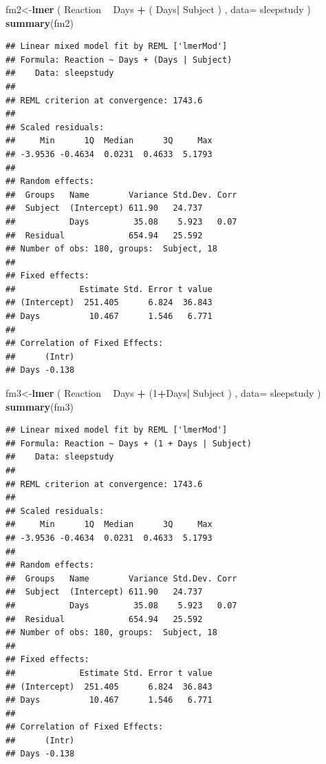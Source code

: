 \documentclass[]{book}
\newenvironment{Shaded}{\begin{snugshade}}{\end{snugshade}}
\newcommand{\KeywordTok}[1]{\textcolor[rgb]{0.13,0.29,0.53}{\textbf{#1}}}
\newcommand{\DataTypeTok}[1]{\textcolor[rgb]{0.13,0.29,0.53}{#1}}
\newcommand{\DecValTok}[1]{\textcolor[rgb]{0.00,0.00,0.81}{#1}}
\newcommand{\StringTok}[1]{\textcolor[rgb]{0.31,0.60,0.02}{#1}}
\newcommand{\OperatorTok}[1]{\textcolor[rgb]{0.81,0.36,0.00}{\textbf{#1}}}
\newcommand{\NormalTok}[1]{#1}
\begin{document}
\begin{Shaded}
\begin{Highlighting}[]
\NormalTok{fm2<-}\KeywordTok{lmer}\NormalTok{ ( Reaction }\OperatorTok{~}\StringTok{ }\NormalTok{Days }\OperatorTok{+}\StringTok{ }\NormalTok{( Days}\OperatorTok{|}\StringTok{ }\NormalTok{Subject ) , }\DataTypeTok{data=}\NormalTok{ sleepstudy )}
\KeywordTok{summary}\NormalTok{(fm2)}
\end{Highlighting}
\end{Shaded}

\begin{verbatim}
## Linear mixed model fit by REML ['lmerMod']
## Formula: Reaction ~ Days + (Days | Subject)
##    Data: sleepstudy
## 
## REML criterion at convergence: 1743.6
## 
## Scaled residuals: 
##     Min      1Q  Median      3Q     Max 
## -3.9536 -0.4634  0.0231  0.4633  5.1793 
## 
## Random effects:
##  Groups   Name        Variance Std.Dev. Corr
##  Subject  (Intercept) 611.90   24.737       
##           Days         35.08    5.923   0.07
##  Residual             654.94   25.592       
## Number of obs: 180, groups:  Subject, 18
## 
## Fixed effects:
##             Estimate Std. Error t value
## (Intercept)  251.405      6.824  36.843
## Days          10.467      1.546   6.771
## 
## Correlation of Fixed Effects:
##      (Intr)
## Days -0.138
\end{verbatim}

\begin{Shaded}
\begin{Highlighting}[]
\NormalTok{fm3<-}\KeywordTok{lmer}\NormalTok{ ( Reaction }\OperatorTok{~}\StringTok{ }\NormalTok{Days }\OperatorTok{+}\StringTok{ }\NormalTok{(}\DecValTok{1}\OperatorTok{+}\NormalTok{Days}\OperatorTok{|}\StringTok{ }\NormalTok{Subject ) , }\DataTypeTok{data=}\NormalTok{ sleepstudy )}
\KeywordTok{summary}\NormalTok{(fm3)}
\end{Highlighting}
\end{Shaded}

\begin{verbatim}
## Linear mixed model fit by REML ['lmerMod']
## Formula: Reaction ~ Days + (1 + Days | Subject)
##    Data: sleepstudy
## 
## REML criterion at convergence: 1743.6
## 
## Scaled residuals: 
##     Min      1Q  Median      3Q     Max 
## -3.9536 -0.4634  0.0231  0.4633  5.1793 
## 
## Random effects:
##  Groups   Name        Variance Std.Dev. Corr
##  Subject  (Intercept) 611.90   24.737       
##           Days         35.08    5.923   0.07
##  Residual             654.94   25.592       
## Number of obs: 180, groups:  Subject, 18
## 
## Fixed effects:
##             Estimate Std. Error t value
## (Intercept)  251.405      6.824  36.843
## Days          10.467      1.546   6.771
## 
## Correlation of Fixed Effects:
##      (Intr)
## Days -0.138
\end{verbatim}
\end{document}
